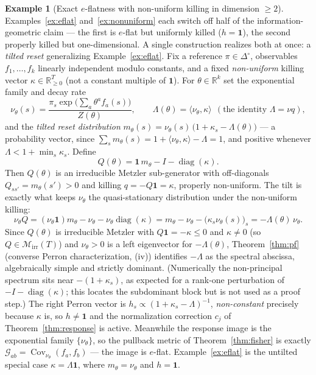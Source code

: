 \documentclass[11pt,reqno]{amsart}
\theoremstyle{plain}
\theoremstyle{definition}
\newtheorem{example}[theorem]{Example}
\theoremstyle{remark}
\newcommand{\R}{\mathbb{R}}
\newcommand{\Simp}{\Delta^{\!\circ}}
\newcommand{\one}{\mathbf{1}}
\DeclareMathOperator{\diag}{diag}
\begin{document}
\begin{example}[Exact $e$-flatness with non-uniform killing in dimension $\ge2$]\label{ex:eflat-nonuniform}
Examples~\ref{ex:eflat} and~\ref{ex:nonuniform} each switch off half of the
information-geometric claim --- the first is $e$-flat but uniformly killed ($h=\one$), the
second properly killed but one-dimensional. A single construction realizes both at once: a
\emph{tilted reset} generalizing Example~\ref{ex:eflat}. Fix a reference $\pi\in\Simp$,
observables $f_1,\dots,f_k$ linearly independent modulo constants, and a fixed
\emph{non-uniform} killing vector $\kappa\in\R^{T}_{\ge0}$ (not a constant multiple of
$\one$). For $\theta\in\R^k$ set the exponential family and decay rate
\[
\nu_\theta(s)=\frac{\pi_s\exp\!\bigl(\sum_a\theta^af_a(s)\bigr)}{Z(\theta)},
\qquad \Lambda(\theta)=\langle\nu_\theta,\kappa\rangle\ \ (\text{the identity }\Lambda=\nu q),
\]
and the \emph{tilted reset distribution}
$m_\theta(s)=\nu_\theta(s)\,\bigl(1+\kappa_s-\Lambda(\theta)\bigr)$ --- a probability vector,
since $\sum_sm_\theta(s)=1+\langle\nu_\theta,\kappa\rangle-\Lambda=1$, and positive whenever
$\Lambda<1+\min_s\kappa_s$. Define
\[
Q(\theta)=\one\,m_\theta-I-\diag(\kappa).
\]
Then $Q(\theta)$ is an irreducible Metzler sub-generator with off-diagonals
$Q_{ss'}=m_\theta(s')>0$ and killing $q=-Q\one=\kappa$, properly non-uniform. The tilt is
exactly what keeps $\nu_\theta$ the quasi-stationary distribution under the non-uniform
killing:
\[
\nu_\theta Q=(\nu_\theta\one)m_\theta-\nu_\theta-\nu_\theta\diag(\kappa)
=m_\theta-\nu_\theta-\bigl(\kappa_s\nu_\theta(s)\bigr)_s=-\Lambda(\theta)\,\nu_\theta.
\]
Since $Q(\theta)$ is irreducible Metzler with $Q\one=-\kappa\le0$ and $\kappa\neq0$
(so $Q\in\mathcal M_{\mathrm{irr}}(T)$) and $\nu_\theta>0$ is a left eigenvector for
$-\Lambda(\theta)$, Theorem~\ref{thm:pf} (converse Perron characterization, (iv))
identifies $-\Lambda$ as the spectral abscissa, algebraically simple and strictly
dominant. (Numerically the non-principal spectrum sits near $-(1+\kappa_s)$, as
expected for a rank-one perturbation of $-I-\diag(\kappa)$; this locates the
subdominant block but is not used as a proof step.) The right Perron vector is $h_s\propto(1+\kappa_s-\Lambda)^{-1}$, \emph{non-constant}
precisely because $\kappa$ is, so $h\neq\one$ and the normalization correction $c_j$ of
Theorem~\ref{thm:response} is active. Meanwhile the response image is the exponential family
$\{\nu_\theta\}$, so the pullback metric of Theorem~\ref{thm:fisher} is exactly
$\mathcal G_{ab}=\operatorname{Cov}_{\nu_\theta}(f_a,f_b)$ --- the image is $e$-flat.
Example~\ref{ex:eflat} is the untilted special case $\kappa=\Lambda\one$, where
$m_\theta=\nu_\theta$ and $h=\one$.


\end{example}
\end{document}
